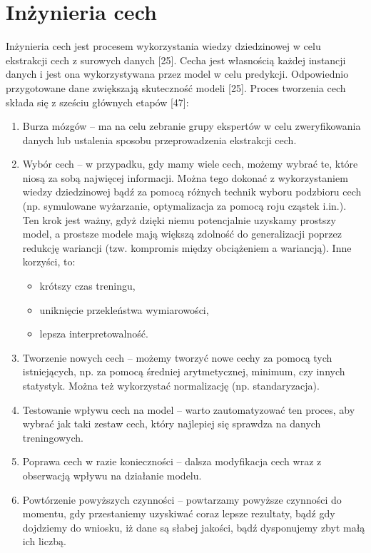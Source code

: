 \section{Inżynieria cech}
\label{cha:cha3.3}

Inżynieria cech jest procesem wykorzystania wiedzy dziedzinowej w celu ekstrakcji cech z surowych danych [25]. Cecha jest własnością każdej instancji danych i jest ona wykorzystywana przez model w celu predykcji. Odpowiednio przygotowane dane zwiększają skuteczność modeli [25]. Proces tworzenia cech składa się z sześciu głównych etapów [47]:

\begin{enumerate}
	\item Burza mózgów – ma na celu zebranie grupy ekspertów w celu zweryfikowania danych lub ustalenia sposobu przeprowadzenia ekstrakcji cech.

	\item Wybór cech – w przypadku, gdy mamy wiele cech, możemy wybrać te, które niosą za sobą najwięcej informacji. Można tego dokonać z wykorzystaniem wiedzy dziedzinowej bądź za pomocą różnych technik wyboru podzbioru cech (np. symulowane wyżarzanie, optymalizacja za pomocą roju cząstek i.in.). Ten krok jest ważny, gdyż dzięki niemu potencjalnie uzyskamy prostszy model, a prostsze modele mają większą zdolność do generalizacji poprzez redukcję wariancji (tzw. kompromis między obciążeniem a wariancją). Inne korzyści, to:
	\begin{itemize}
	\item
	krótszy czas treningu,

	\item
	uniknięcie przekleństwa wymiarowości,

	\item
	lepsza interpretowalność.
	\end{itemize}
	\item Tworzenie nowych cech – możemy tworzyć nowe cechy za pomocą tych istniejących, np. za pomocą średniej arytmetycznej, minimum, czy innych statystyk. Można też wykorzystać normalizację (np. standaryzacja).

	\item Testowanie wpływu cech na model – warto zautomatyzować ten proces, aby wybrać jak taki zestaw cech, który najlepiej się sprawdza na danych treningowych.

	\item Poprawa cech w razie konieczności – dalsza modyfikacja cech wraz z obserwacją wpływu na działanie modelu.

	\item Powtórzenie powyższych czynności – powtarzamy powyższe czynności do momentu, gdy przestaniemy uzyskiwać coraz lepsze rezultaty, bądź gdy dojdziemy do wniosku, iż dane są słabej jakości, bądź dysponujemy zbyt małą ich liczbą.
\end{enumerate}

